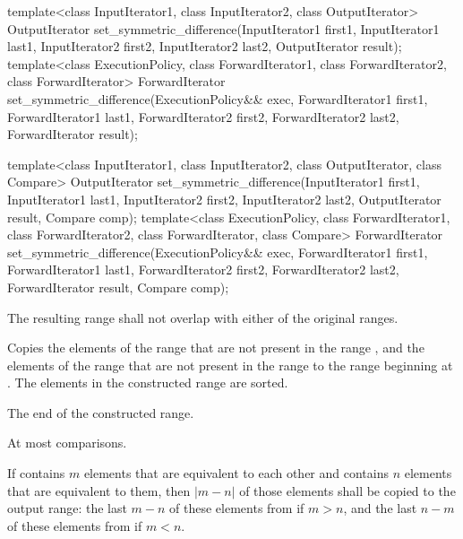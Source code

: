 %
\begin{itemdecl}
template<class InputIterator1, class InputIterator2,
         class OutputIterator>
  OutputIterator
    set_symmetric_difference(InputIterator1 first1, InputIterator1 last1,
                             InputIterator2 first2, InputIterator2 last2,
                             OutputIterator result);
template<class ExecutionPolicy, class ForwardIterator1, class ForwardIterator2,
         class ForwardIterator>
  ForwardIterator
    set_symmetric_difference(ExecutionPolicy&& exec,
                             ForwardIterator1 first1, ForwardIterator1 last1,
                             ForwardIterator2 first2, ForwardIterator2 last2,
                             ForwardIterator result);

template<class InputIterator1, class InputIterator2,
         class OutputIterator, class Compare>
  OutputIterator
    set_symmetric_difference(InputIterator1 first1, InputIterator1 last1,
                             InputIterator2 first2, InputIterator2 last2,
                             OutputIterator result, Compare comp);
template<class ExecutionPolicy, class ForwardIterator1, class ForwardIterator2,
         class ForwardIterator, class Compare>
  ForwardIterator
    set_symmetric_difference(ExecutionPolicy&& exec,
                             ForwardIterator1 first1, ForwardIterator1 last1,
                             ForwardIterator2 first2, ForwardIterator2 last2,
                             ForwardIterator result, Compare comp);
\end{itemdecl}

\begin{itemdescr}
\pnum
\requires
The resulting range shall not overlap with either of the original ranges.

\pnum
\effects
Copies the elements of the range
that are not present in the range
,
and the elements of the range
that are not present in the range
to the range beginning at
.
The elements in the constructed range are sorted.

\pnum
\returns
The end of the constructed range.

\pnum
\complexity
At most
comparisons.

\pnum
\remarks
If  contains $m$ elements that are equivalent to each other and
 contains $n$ elements that are equivalent to them, then
$|m - n|$ of those elements shall be copied to the output range: the last
$m - n$ of these elements from  if $m > n$, and the last
$n - m$ of these elements from  if $m < n$.
\end{itemdescr}

